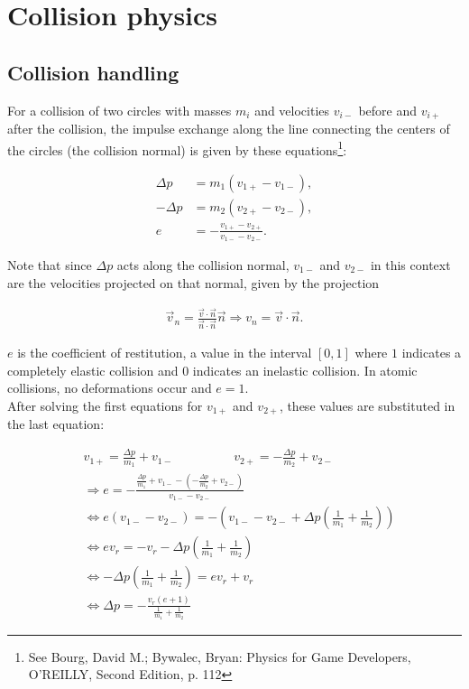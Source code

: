 \documentclass{article}
\begin{document}
	\section{Collision physics}
	\subsection{Collision handling}

	For a collision of two circles with masses $m_i$ and velocities $v_{i-}$ before and $v_{i+}$ after the collision, the impulse exchange  along the line connecting the centers of the circles (the collision normal) is given by these equations\footnote{See Bourg, David M.; Bywalec, Bryan: Physics for Game Developers, O'REILLY, Second Edition, p. 112}:
	
	\begin{align*}
		\Delta p &= m_1\left(v_{1+} - v_{1-}\right),\\
		-\Delta p &= m_2\left(v_{2+} - v_{2-}\right),\\
		e &= -\frac{v_{1+} - v_{2+}}{v_{1-} - v_{2-}}.
	\end{align*}
	
	Note that since $\Delta p$ acts along the collision normal, $v_{1-}$ and $v_{2-}$ in this context are the velocities projected on that normal, given by the projection
	
	\begin{align*}
		\vec{v}_n = \frac{\vec{v}\cdot\vec{n}}{\vec{n}\cdot\vec{n}}\vec{n} \Rightarrow v_n = \vec{v}\cdot\vec{n}.
	\end{align*}

	$e$ is the coefficient of restitution, a value in the interval $[0, 1]$ where $1$ indicates a completely elastic collision 
	 and $0$ indicates an inelastic collision. In atomic collisions, no deformations occur and $e = 1$.\\
	After solving the first equations for $v_{1+}$ and $v_{2+}$, these values are substituted in the last equation:
	
	\begin{align*}
		&v_{1+} = \frac{\Delta p}{m_1} + v_{1-} \hspace{2cm} v_{2+} = -\frac{\Delta p}{m_2} + v_{2-}\\
		&\Rightarrow e = -\frac{\frac{\Delta p}{m_1} + v_{1-} - \left(-\frac{\Delta p}{m_2} + v_{2-}\right)}{v_{1-} - v_{2-}}\\
		&\Leftrightarrow e\left(v_{1-} - v_{2-}\right) = -\left(v_{1-} - v_{2-} + \Delta p\left(\frac{1}{m_1} + \frac{1}{m_2}\right)\right)\\
		&\Leftrightarrow ev_r = -v_r - \Delta p\left(\frac{1}{m_1} + \frac{1}{m_2}\right)\\
		&\Leftrightarrow -\Delta p\left(\frac{1}{m_1} + \frac{1}{m_2}\right) = e v_r + v_r\\
		&\Leftrightarrow \Delta p = -\frac{v_r(e + 1)}{\frac{1}{m_1} + \frac{1}{m_2}}
	\end{align*}
\end{document}
